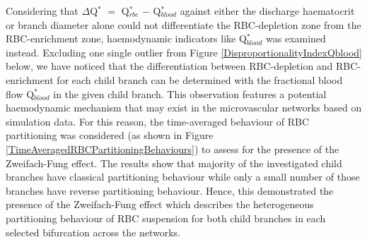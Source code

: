 \noindent Considering that $\Delta$Q$^{*}$ $=$ Q$^{*}_{rbc}$ $-$ Q$^{*}_{blood}$ against either the discharge haematocrit or branch diameter alone could not differentiate the RBC-depletion zone from the RBC-enrichment zone, haemodynamic indicators like Q$^{*}_{blood}$ was examined instead. Excluding one single outlier from Figure \ref{DisproportionalityIndexQblood} below, we have noticed that the differentiation between RBC-depletion and RBC-enrichment for each child branch can be determined with the fractional blood flow Q$^{*}_{blood}$ in the given child branch. This observation features a potential haemodynamic mechanism that may exist in the microvascular networks based on simulation data. For this reason, the time-averaged behaviour of RBC partitioning was considered (as shown in Figure \ref{TimeAveragedRBCPartitioningBehaviours}) to assess for the presence of the Zweifach-Fung effect.\cite{SVANES1968210, FUNG197334} The results show that majority of the investigated child branches have classical partitioning behaviour while only a small number of those branches have reverse partitioning behaviour. Hence, this demonstrated the presence of the Zweifach-Fung effect which describes the heterogeneous partitioning behaviour of RBC suspension for both child branches in each selected bifurcation across the networks. 

